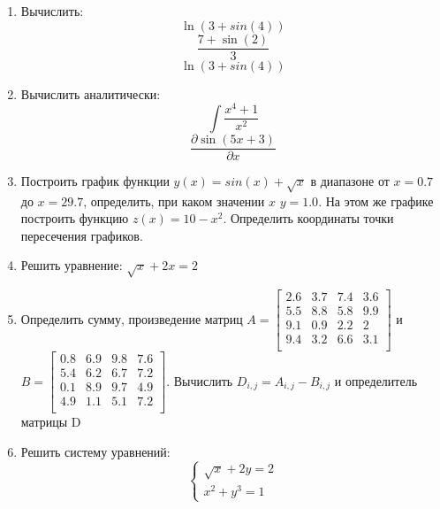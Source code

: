 \begin{enumerate}
\item Вычислить: 
\begin{equation*}\ln(3+sin(4))                     \end{equation*}
\begin{equation*}\dfrac{7+\sin(2)}{3}              \end{equation*}
\begin{equation*}\ln(3+sin(4))                     \end{equation*}

\item Вычислить аналитически: 
 \begin{equation*} \int \dfrac{x^4+1}{x^2} \end{equation*}\begin{equation*} {\dfrac{\partial \sin(5 x +3)}{\partial x}} \end{equation*}
\item Построить график функции $y(x)=sin(x)+\sqrt{x}  $ в диапазоне от $x=0.7$ до $x=29.7$, определить, при каком значении $x$ $y=1.0$. На этом же графике построить функцию $z(x)=10-x^2                    $. Определить координаты точки пересечения графиков. \item Решить уравнение: $\sqrt{x}+2x=2        $

\item Определить сумму, произведение матриц $A=\begin{bmatrix}
2.6 &3.7 &7.4 &3.6 \\
5.5 &8.8 &5.8 &9.9 \\
9.1 &0.9 &2.2 &2 \\
9.4 &3.2 &6.6 &3.1 \\
\end{bmatrix}
$ и $B=\begin{bmatrix}
0.8 &6.9 &9.8 &7.6 \\
5.4 &6.2 &6.7 &7.2 \\
0.1 &8.9 &9.7 &4.9 \\
4.9 &1.1 &5.1 &7.2 \\
\end{bmatrix}
$. Вычислить $D_{i,j}=A_{i,j}  -  B_{i,j}$ и определитель матрицы D

\item Решить систему уравнений: \begin{equation*} \begin{cases} \sqrt{x}+2y=2        \\ x^2 + y^3=1           \end{cases} \end{equation*} 

\end{enumerate}
